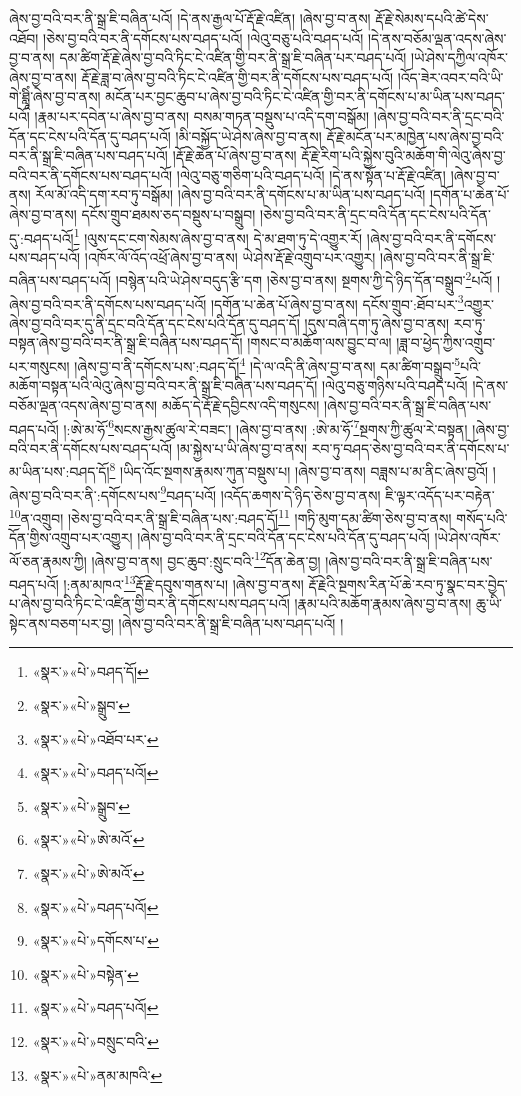 ཞེས་བྱ་བའི་བར་ནི་སྒྲ་ཇི་བཞིན་པའོ། །དེ་ནས་རྒྱལ་པོ་རྡོ་རྗེ་འཛིན། །ཞེས་བྱ་བ་ནས། རྡོ་རྗེ་སེམས་དཔའི་ཚེ་དེས་འཐོབ། །ཅེས་བྱ་བའི་བར་ནི་དགོངས་པས་བཤད་པའོ། །ལེའུ་བཅུ་པའི་བཤད་པའོ། །དེ་ནས་བཅོམ་ལྡན་འདས་ཞེས་བྱ་བ་ནས། དམ་ཚིག་རྡོ་རྗེ་ཞེས་བྱ་བའི་ཏིང་ངེ་འཛིན་གྱི་བར་ནི་སྒྲ་ཇི་བཞིན་པར་བཤད་པའོ། །ཡེ་ཤེས་དཀྱིལ་འཁོར་ཞེས་བྱ་བ་ནས། རྡོ་རྗེ་ཟླ་བ་ཞེས་བྱ་བའི་ཏིང་ངེ་འཛིན་གྱི་བར་ནི་དགོངས་པས་བཤད་པའོ། །འོད་ཟེར་འབར་བའི་ཡི་གེ་ཐླཱིཾ་ཞེས་བྱ་བ་ནས། མངོན་པར་བྱང་ཆུབ་པ་ཞེས་བྱ་བའི་ཏིང་ངེ་འཛིན་གྱི་བར་ནི་དགོངས་པ་མ་ཡིན་པས་བཤད་པའོ། །རྣམ་པར་དབེན་པ་ཞེས་བྱ་བ་ནས། བསམ་གཏན་བསྡུས་པ་འདི་དག་བསྒོམ། །ཞེས་བྱ་བའི་བར་ནི་དྲང་བའི་དོན་དང་ངེས་པའི་དོན་དུ་བཤད་པའོ། །མི་བསྐྱོད་ཡེ་ཤེས་ཞེས་བྱ་བ་ནས། རྡོ་རྗེ་མངོན་པར་མཁྱེན་པས་ཞེས་བྱ་བའི་བར་ནི་སྒྲ་ཇི་བཞིན་པས་བཤད་པའོ། །རྡོ་རྗེ་ཆེན་པོ་ཞེས་བྱ་བ་ནས། རྡོ་རྗེ་རིག་པའི་སྐྱེས་བུའི་མཆོག་གི་ལེའུ་ཞེས་བྱ་བའི་བར་ནི་དགོངས་པས་བཤད་པའོ། །ལེའུ་བཅུ་གཅིག་པའི་བཤད་པའོ། །དེ་ནས་སྟོན་པ་རྡོ་རྗེ་འཛིན། །ཞེས་བྱ་བ་ནས། རོལ་མོ་འདི་དག་རབ་ཏུ་བསྒོམ། །ཞེས་བྱ་བའི་བར་ནི་དགོངས་པ་མ་ཡིན་པས་བཤད་པའོ། །དགོན་པ་ཆེན་པོ་ཞེས་བྱ་བ་ནས། དངོས་གྲུབ་ཐམས་ཅད་བསྡུས་པ་བསྒྲུབ། །ཅེས་བྱ་བའི་བར་ནི་དྲང་བའི་དོན་དང་ངེས་པའི་དོན་དུ་:བཤད་པའོ།\footnote{«སྣར་»«པེ་»བཤད་དོ།} །ལུས་དང་ངག་སེམས་ཞེས་བྱ་བ་ནས། དེ་མ་ཐག་ཏུ་དེ་འགྱུར་རོ། །ཞེས་བྱ་བའི་བར་ནི་དགོངས་པས་བཤད་པའོ། །འཁོར་ལོ་འོད་འཕྲོ་ཞེས་བྱ་བ་ནས། ཡེ་ཤེས་རྡོ་རྗེ་འགྲུབ་པར་འགྱུར། །ཞེས་བྱ་བའི་བར་ནི་སྒྲ་ཇི་བཞིན་པས་བཤད་པའོ། །བསྙེན་པའི་ཡེ་ཤེས་བདུད་རྩི་དག །ཅེས་བྱ་བ་ནས། སྔགས་ཀྱི་དེ་ཉིད་དོན་བསྒྲུབ་\footnote{«སྣར་»«པེ་»སྒྲུབ་}པའོ། །ཞེས་བྱ་བའི་བར་ནི་དགོངས་པས་བཤད་པའོ། །དགོན་པ་ཆེན་པོ་ཞེས་བྱ་བ་ནས། དངོས་གྲུབ་:ཐོབ་པར་\footnote{«སྣར་»«པེ་»འཐོབ་པར་}འགྱུར་ཞེས་བྱ་བའི་བར་དུ་ནི་དྲང་བའི་དོན་དང་ངེས་པའི་དོན་དུ་བཤད་དོ། །དུས་བཞི་དག་ཏུ་ཞེས་བྱ་བ་ནས། རབ་ཏུ་བསྟན་ཞེས་བྱ་བའི་བར་ནི་སྒྲ་ཇི་བཞིན་པས་བཤད་དོ། །གསང་བ་མཆོག་ལས་བྱུང་བ་ལ། །ཟླ་བ་ཕྱེད་ཀྱིས་འགྲུབ་པར་གསུངས། །ཞེས་བྱ་བ་ནི་དགོངས་པས་:བཤད་དོ།\footnote{«སྣར་»«པེ་»བཤད་པའོ།} །དེ་ལ་འདི་ནི་ཞེས་བྱ་བ་ནས། དམ་ཚིག་བསྒྲུབ་\footnote{«སྣར་»«པེ་»སྒྲུབ་}པའི་མཆོག་བསྟན་པའི་ལེའུ་ཞེས་བྱ་བའི་བར་ནི་སྒྲ་ཇི་བཞིན་པས་བཤད་དོ། །ལེའུ་བཅུ་གཉིས་པའི་བཤད་པའོ། །དེ་ནས་བཅོམ་ལྡན་འདས་ཞེས་བྱ་བ་ནས། མཆོད་དེ་རྡོ་རྗེ་དབྱིངས་འདི་གསུངས། །ཞེས་བྱ་བའི་བར་ནི་སྒྲ་ཇི་བཞིན་པས་བཤད་པའོ། །:ཨེ་མ་ཧོ་\footnote{«སྣར་»«པེ་»ཨེ་མའོ་}སངས་རྒྱས་ཚུལ་རེ་བཟང་། །ཞེས་བྱ་བ་ནས། :ཨེ་མ་ཧོ་\footnote{«སྣར་»«པེ་»ཨེ་མའོ་}སྔགས་ཀྱི་ཚུལ་རེ་བསྟན། །ཞེས་བྱ་བའི་བར་ནི་དགོངས་པས་བཤད་པའོ། །མ་སྐྱེས་པ་ཡི་ཞེས་བྱ་བ་ནས། རབ་ཏུ་བཤད་ཅེས་བྱ་བའི་བར་ནི་དགོངས་པ་མ་ཡིན་པས་:བཤད་དོ།\footnote{«སྣར་»«པེ་»བཤད་པའོ།} །ཡིད་འོང་སྔགས་རྣམས་ཀུན་བསྡུས་པ། །ཞེས་བྱ་བ་ནས། བཟླས་པ་མ་ནིང་ཞེས་བྱའོ། །ཞེས་བྱ་བའི་བར་ནི་:དགོངས་པས་\footnote{«སྣར་»«པེ་»དགོངས་པ་}བཤད་པའོ། །འདོད་ཆགས་དེ་ཉིད་ཅེས་བྱ་བ་ནས། ཇི་ལྟར་འདོད་པར་བརྟེན་\footnote{«སྣར་»«པེ་»བསྟེན་}ན་འགྲུབ། །ཅེས་བྱ་བའི་བར་ནི་སྒྲ་ཇི་བཞིན་པས་:བཤད་དོ།\footnote{«སྣར་»«པེ་»བཤད་པའོ།} །གཏི་མུག་དམ་ཚིག་ཅེས་བྱ་བ་ནས། གསོད་པའི་དོན་གྱིས་འགྲུབ་པར་འགྱུར། །ཞེས་བྱ་བའི་བར་ནི་དྲང་བའི་དོན་དང་ངེས་པའི་དོན་དུ་བཤད་པའོ། །ཡེ་ཤེས་འཁོར་ལོ་ཅན་རྣམས་ཀྱི། །ཞེས་བྱ་བ་ནས། བྱང་ཆུབ་:སྲུང་བའི་\footnote{«སྣར་»«པེ་»བསྲུང་བའི་}དོན་ཆེན་བྱ། །ཞེས་བྱ་བའི་བར་ནི་སྒྲ་ཇི་བཞིན་པས་བཤད་པའོ། །:ནམ་མཁའ་\footnote{«སྣར་»«པེ་»ནམ་མཁའི་}རྡོ་རྗེ་དབུས་གནས་པ། །ཞེས་བྱ་བ་ནས། རྡོ་རྗེའི་སྔགས་རིན་པོ་ཆེ་རབ་ཏུ་སྣང་བར་བྱེད་པ་ཞེས་བྱ་བའི་ཏིང་ངེ་འཛིན་གྱི་བར་ནི་དགོངས་པས་བཤད་པའོ། །རྣམ་པའི་མཆོག་རྣམས་ཞེས་བྱ་བ་ནས། ཆུ་ཡི་སྟེང་ནས་བཅག་པར་བྱ། །ཞེས་བྱ་བའི་བར་ནི་སྒྲ་ཇི་བཞིན་པས་བཤད་པའོ། །
